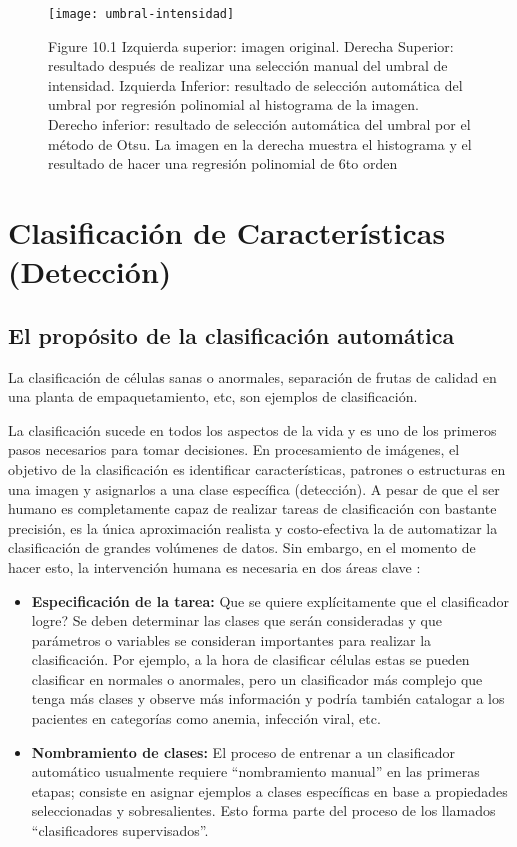     \begin{figure}[H]
        \centering
        \texttt{[image: umbral-intensidad]}
        \caption{Figure 10.1 Izquierda superior: imagen original. Derecha Superior: resultado después de realizar una selección manual del umbral de intensidad. Izquierda Inferior: resultado de selección automática del umbral por regresión polinomial al histograma de la imagen. Derecho inferior: resultado de selección automática del umbral por el método de Otsu. La imagen en la derecha muestra el histograma y el resultado de hacer una regresión polinomial de 6to orden \protect\cite{Solomon2011-xz}}
        \label{fig:umbral-intensidad}
    \end{figure}
    


\section{Clasificación de Características (Detección)}
\subsection{El propósito de la clasificación automática}
La clasificación de células sanas o anormales, separación de frutas de calidad en una planta de empaquetamiento, etc, son ejemplos de clasificación. 

La clasificación sucede en todos los aspectos de la vida y es uno de los primeros pasos necesarios para tomar decisiones. En procesamiento de imágenes, el objetivo de la clasificación es identificar características, patrones o estructuras en una imagen y asignarlos a una clase específica (detección). A pesar de que el ser humano es completamente capaz de realizar tareas de clasificación con bastante precisión, es la única aproximación realista y costo-efectiva la de automatizar la clasificación de grandes volúmenes de datos. Sin embargo, en el momento de hacer esto, la intervención humana es necesaria en dos áreas clave \cite{Solomon2011-xz}: 

\begin{itemize}
\item \textbf{Especificación de la tarea: }Que se quiere explícitamente que el clasificador logre? Se deben determinar las clases que serán consideradas y que parámetros o variables se consideran importantes para realizar la clasificación. Por ejemplo, a la hora de clasificar células estas se pueden clasificar en normales o anormales, pero un clasificador más complejo que tenga más clases y observe más información y podría también catalogar a los pacientes en categorías como anemia, infección viral, etc.
\item \textbf{Nombramiento de clases: }El proceso de entrenar a un clasificador automático usualmente requiere “nombramiento manual” en las primeras etapas; consiste en asignar ejemplos a clases específicas en base a propiedades seleccionadas y sobresalientes. Esto forma parte del proceso de los llamados “clasificadores supervisados”.
\end{itemize}

